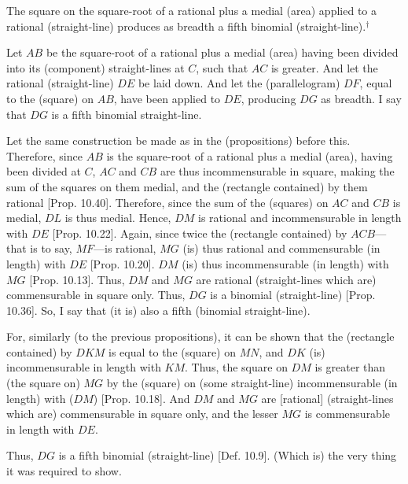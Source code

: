 \begin{Parallel}{}{}
{The square on the square-root of a rational
plus a medial (area) applied to a rational (straight-line) produces as breadth
a fifth binomial (straight-line).$^\dag$

Let $AB$ be the square-root of a rational plus a medial (area) having been divided
into its (component) straight-lines at $C$, such that $AC$ is greater. 
And let the rational (straight-line) $DE$ be laid down. And let the
(parallelogram) $DF$, equal to the (square) on $AB$, have been applied
to $DE$, producing $DG$ as breadth. I say that $DG$ is a fifth
binomial straight-line.

\epsfysize=1.5in 
\centerline{}

Let the same construction  be made as in the (propositions)
before this. Therefore, since $AB$ is the square-root of a
rational plus a medial (area), having been  divided at $C$, $AC$ and $CB$ are thus
incommensurable in square, making the sum of the squares on them
medial, and the (rectangle contained) by them rational [Prop. 10.40]. Therefore, since the
sum of the (squares) on $AC$ and $CB$ is medial, $DL$ is thus
medial. Hence, $DM$ is rational and incommensurable
in length with $DE$ [Prop. 10.22]. Again,
since twice the (rectangle contained) by $ACB$---that is to say,
$MF$---is rational, $MG$ (is) thus rational and commensurable
(in length) with $DE$ [Prop. 10.20]. 
$DM$ (is) thus incommensurable (in length) with $MG$ [Prop. 10.13]. Thus, $DM$ and $MG$
are rational (straight-lines which are) commensurable in square only. Thus,
$DG$ is a binomial (straight-line) [Prop. 10.36].
So, I say that (it is) also a fifth (binomial straight-line).

For, similarly (to the previous propositions), it can be shown that the
(rectangle contained) by $DKM$ is equal to the (square) on $MN$,
and $DK$ (is) incommensurable in length with $KM$. Thus, the
square on $DM$ is greater than (the square on) $MG$ by the (square)
on (some straight-line) incommensurable (in length) with ($DM$)
[Prop. 10.18]. And  $DM$ and $MG$
are [rational] (straight-lines which are) commensurable in square only,
and the lesser $MG$ is commensurable in length with $DE$.

Thus, $DG$ is a fifth binomial (straight-line) [Def. 10.9]. (Which is) the very thing it was required to show.}
\end{Parallel}


\vspace{7pt}{\footnotesize\noindent$^\dag$ In other words, the square of the square-root of a rational plus medial  is a
fifth binomial. See Prop.~10.58.}

